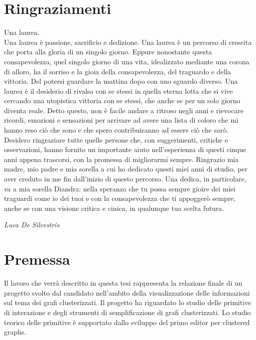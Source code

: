 \section{Ringraziamenti}
\label{sec:ringraziamenti}
Una laurea.\\
Una laurea è passione, sacrificio e dedizione. Una laurea è un percorso di crescita che porta alla gloria di un singolo giorno. Eppure nonostante questa consapevolezza, quel singolo giorno di una vita, idealizzato mediante una corona di alloro, ha il sorriso e la gioia della consapevolezza, del traguardo e della vittoria. Del potersi guardare la mattina dopo con uno sguardo diverso. Una laurea è il desiderio di rivalsa con se stessi in quella eterna lotta che si vive cercando una utopistica vittoria con se stessi, che anche se per un solo giorno diventa reale. Detto questo, non è facile andare a ritroso negli anni e rievocare ricordi, emozioni e sensazioni per arrivare ad avere una lista di coloro che mi hanno reso ciò che sono e che spero contribuiranno ad essere ciò che sarò. Desidero ringraziare tutte quelle persone che, con suggerimenti, critiche e osservazioni, hanno fornito un importante aiuto nell'esperienza di questi cinque anni appena trascorsi, con la promessa di migliorarmi sempre.	
Ringrazio mia madre, mio padre e mia sorella a cui ho dedicato questi miei anni di studio, per aver creduto in me fin dall'inizio di questo percorso. Una dedica, in particolare, va a mia sorella Diandra: nella speranza che tu possa sempre gioire dei miei traguardi come io dei tuoi e con la consapevolezza che ti appoggerò sempre, anche se con una visione critica e cinica, in qualunque tua scelta futura.\\
   \begin{flushright}
   	\textit{Luca De Silvestris}
   \end{flushright} 
\newpage
\section{Premessa}
Il lavoro che verr\`a descritto in questa tesi rappresenta la relazione finale di un progetto svolto dal candidato nell'ambito della visualizzazione delle informazioni sul tema dei grafi clusterizzati. Il progetto ha riguardato lo studio delle primitive di interazione e degli strumenti di semplificazione di grafi clusterizzati. Lo studio teorico delle primitive è supportato dallo sviluppo del primo editor per clustered graphs.

